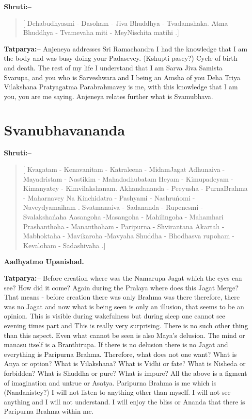 \textbf{Shruti:–}

\begin{verse}
[ Dehabudhyasmi - Dasoham - Jiva Bhuddhya - Tvadam\break shaka.  Atma Bhuddhya - Tvamevaha miti - Mey\break Nischita matihi .]
\end{verse}

\textbf{Tatparya:–} Anjeneya addresses Sri Ramachandra I had the knowledge that I am the body and was busy doing your Padasevey. (Kshupti pasey?) Cycle of birth and death. The rest of my life I understand that I am Sarva Jiva Samista Svarupa, and you who is Sarveshwara and I being an Amsha of you Deha Triya Vilakshana Pratyagatma Parabrahmavey is me, with this knowledge that I am you, you are me saying. Anjeneya relates further what is Svamubhava.

\chapter{Svanubhavananda}

\textbf{Shruti:–}

\begin{verse}
[ Kvagatam - Kenavanitam - Katraleena - Midam\break Jagat  Adhunaiva - Mayadristam - Nastikim - Maha\break dadhubatam  Heyam - Kimupadeyam - Kimanyatey - Kimvilakshanam.  Akhandananda - Peeyusha - Purna\break Brahma - Maharnavey  Na Kinchidatra - Pashyami - Nashruńomi - Naveydyamaiham . Svatmanaiva - Sada\break nanda - Rupenesmi - Svalakshańaha  Aasangoha -\break Masangoha - Mahilingoha - Mahamhari  Prasha\break nthoha - Mananthoham - Paripurna - Shviran\break tana  Akartah - Mabhoktaha - Mavikaroha -\break Mavyaha  Shuddha - Bhodhasva rupoham - Kevaloham - Sadashivaha .]
\end{verse}

\begin{flushright}
\textbf{Aadhyatmo Upanishad.}
\end{flushright}

\textbf{Tatparya:–} Before creation where was the Namarupa Jagat which the eyes can see? How did it come? Again during the Pralaya where does this Jagat Merge? That means - before creation there was only Brahma was there therefore, there was no Jagat and now what is being seen is only an illusion, that seems to be an opinion. This is visible during wakefulness but during sleep one cannot see evening times part and This is really very surprising. There is no such other thing than this aspect. Even what cannot be seen is also Maya's delusion. The mind or manasu itself is a Branthirupa. If there is no delusion there is no Jagat and everything is Paripurna Brahma. Therefore, what does not one want? What is Anya or option? What is Vilakshana? What is Vidhi or fate? What is Nisheda or forbidden? What is Shuddha or pure? What is impure? All the above is a figment of imagination and untrue or Asatya. Paripurna Brahma is me which is (Nandanistey?) I will not listen to anything other than myself. I will not see anything and I will not understand. I will enjoy the bliss or Ananda that there is Paripurna Brahma within me.

